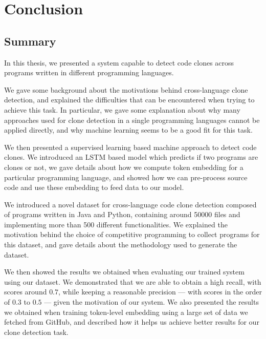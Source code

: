 \chapter{\label{ch:conclusion}Conclusion}
\section{Summary}
In this thesis, we presented a system capable to detect code clones across
programs written in different programming languages.

We gave some background about the motivations behind cross-language clone
detection, and explained the difficulties that can be encountered when trying to
achieve this task. In particular, we gave some explanation about why many
approaches used for clone detection in a single programming languages cannot be
applied directly, and why machine learning seems to be a good fit for this task.

We then presented a supervised learning based machine approach to detect
code clones. We introduced an LSTM based model which predicts if two programs
are clones or not, we gave details about how we compute token embedding for
a particular programming language, and showed how we can pre-process source code
and use these embedding to feed data to our model.

We introduced a novel dataset for cross-language code clone
detection composed of programs written in Java and Python, containing around
50000 files and implementing more than 500 different functionalities. We
explained the motivation behind the choice of competitive programming to collect
programs for this dataset, and gave details about the methodology used to
generate the dataset.

We then showed the results we obtained when evaluating our trained system using
our dataset. We demonstrated that we are able to obtain a high recall, with
scores around $0.7$, while keeping a reasonable precision --- with scores in the
order of $0.3$ to $0.5$ --- given the motivation of our system. We also
presented the results we obtained when training token-level embedding using a
large set of data we fetched from GitHub, and described how it helps us achieve
better results for our clone detection task.
